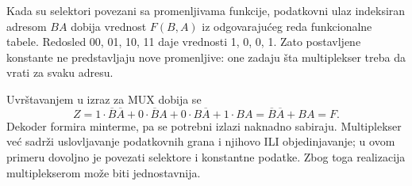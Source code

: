 
Kada su selektori povezani sa promenljivama funkcije, podatkovni ulaz indeksiran adresom \(BA\) dobija vrednost \(F(B,A)\) iz odgovarajućeg reda funkcionalne tabele. Redosled 00, 01, 10, 11 daje vrednosti 1, 0, 0, 1. Zato postavljene konstante ne predstavljaju nove promenljive: one zadaju šta multiplekser treba da vrati za svaku adresu.

Uvrštavanjem u izraz za MUX dobija se
\[
 Z=1\cdot\overline B\overline A
   +0\cdot\overline BA
   +0\cdot B\overline A+1\cdot BA
   =\overline B\overline A+BA=F.
\]
Dekoder formira minterme, pa se potrebni izlazi naknadno sabiraju. Multiplekser već sadrži uslovljavanje podatkovnih grana i njihovo ILI objedinjavanje; u ovom primeru dovoljno je povezati selektore i konstantne podatke. Zbog toga realizacija multiplekserom može biti jednostavnija.
